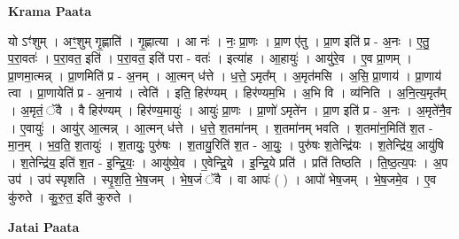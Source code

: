 \documentclass[17pt]{extarticle}
\begin{document}
\textbf{Krama Paata} \newline

यो ऽꣳ॑शुम् । अꣳ॒॒शुम् गृ॒ह्णाति॑ । गृ॒ह्णात्या । आ नः॑ । नः॒ प्रा॒णः । प्रा॒ण ए॑तु । प्रा॒ण इति॑ प्र - अ॒नः । ए॒तु॒ प॒रा॒वतः॑ । प॒रा॒वत॒ इति॑ । प॒रा॒वत॒ इति॑ परा - वतः॑ । इत्या॑ह । आ॒हायुः॑ । आयु॑रे॒व । ए॒व प्रा॒णम् । प्रा॒णमा॒त्मन्न् । प्रा॒णमिति॑ प्र - अ॒नम् । आ॒त्मन् ध॑त्ते । ध॒त्ते॒ ऽमृत᳚म् । अ॒मृत॑मसि । अ॒सि॒ प्रा॒णाय॑ । प्रा॒णाय॑ त्वा । प्रा॒णायेति॑ प्र - अ॒नाय॑ । त्वेति॑ । इति॒ हिर॑ण्यम् । हिर॑ण्यम॒भि । अ॒भि वि । व्य॑निति । अ॒नि॒त्य॒मृत᳚म् । अ॒मृतं॒ ॅवै । वै हिर॑ण्यम् । हिर॑ण्य॒मायुः॑ । आयुः॑ प्रा॒णः । प्रा॒णो॑ ऽमृते॑न । प्रा॒ण इति॑ प्र - अ॒नः । अ॒मृते॑नै॒व । ए॒वायुः॑ । आयु॑र् आ॒त्मन्न् । आ॒त्मन् ध॑त्ते । ध॒त्ते॒ श॒तमा॑नम् । श॒तमा॑नम् भवति । श॒तमा॑न॒मिति॑ श॒त - मा॒न॒म् । भ॒व॒ति॒ श॒तायुः॑ । श॒तायुः॒ पुरु॑षः । श॒तायु॒रिति॑ श॒त - आ॒युः॒ । पुरु॑षः श॒तेन्द्रि॑यः । श॒तेन्द्रि॑य॒ आयु॑षि । श॒तेन्द्रि॑य॒ इति॑ श॒त - इ॒न्द्रि॒यः॒ । आयु॑ष्ये॒व । ए॒वेन्द्रि॒ये । इ॒न्द्रि॒ये प्रति॑ । प्रति॑ तिष्ठति । ति॒ष्ठ॒त्य॒पः । अ॒प उप॑ । उप॑ स्पृशति । स्पृ॒श॒ति॒ भे॒ष॒जम् । भे॒ष॒जं ॅवै । वा आपः॑ ( ) । आपो॑ भेष॒जम् । भे॒ष॒जमे॒व । ए॒व कु॑रुते । कु॒रु॒त॒ इति॑ कुरुते । \newline

\textbf{Jatai Paata} \newline
\end{document}
